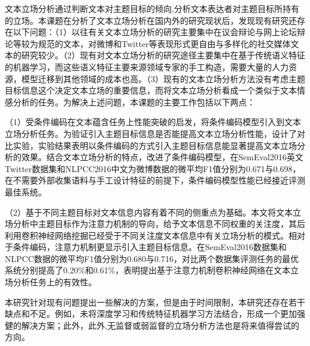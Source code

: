 

文本立场分析通过判断文本对主题目标的倾向,分析文本表达者对主题目标所持有的立场。本课题在分析了文本立场分析在国内外的研究现状后，发现现有研究还存在以下问题：（1）以往有关文本立场分析的研究主要集中在议会辩论与网上论坛辩论等较为规范的文本，对微博和Twitter等表现形式更自由与多样化的社交媒体文本的研究较少。（2）现有对文本立场分析的研究途径主要集中在基于传统语义特征的机器学习，而这些语义特征主要来源领域专家的手工构造，需要大量的人力资源，模型迁移到其他领域的成本也高。（3）现有的文本立场分析方法没有考虑主题目标信息这个决定文本立场的重要信息，而将文本立场分析看成一个类似于文本情感分析的任务。为解决上述问题，本课题的主要工作包括以下两点：


（1）受条件编码在文本蕴含任务上性能突破的启发，将条件编码模型引入到文本立场分析任务。为验证引入主题目标信息是否能提高文本立场分析性能，设计了对比实验，实验结果表明以条件编码的方式引入主题目标信息能显著提高文本立场分析的效果。结合文本立场分析的特点，改进了条件编码模型，在SemEval2016英文Twitter数据集和NLPCC2016中文为微博数据的微平均F1值分别为0.671与0.698，在不需要外部收集语料与手工设计特征的前提下，条件编码模型性能已经接近评测最佳系统。

（2）基于不同主题目标对文本信息内容有着不同的侧重点为基础。本文将文本立场分析中主题目标作为注意力机制的导向，给予文本信息不同权重的关注度，其后利用卷积神经网络挖掘已经受于不同关注度文本信息中有关立场分析的模式。相对于条件编码，注意力机制更显示引入主题目标信息。在SemEval2016数据集和NLPCC数据的微平均F1值分别为0.680与0.716，对比两个数据集评测任务的最优系统分别提高了0.20\%和0.61\%，表明提出基于注意力机制卷积神经网络在文本立场分析任务上的有效性。

本研究针对现有问题提出一些解决的方案，但是由于时间限制，本研究还存在若干缺点和不足。例如，未将深度学习和传统特征机器学习方法结合，形成一个更加强健的解决方案；此外，此外,无监督或弱监督的立场分析方法也是将来值得尝试的方向。
